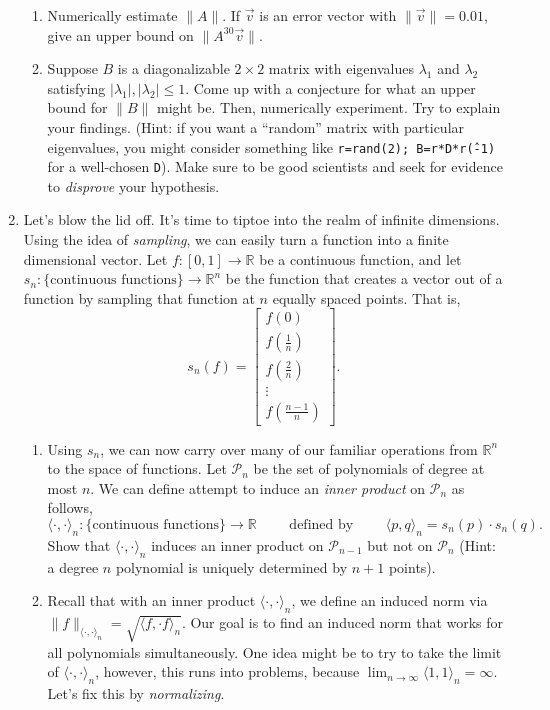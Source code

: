 \documentclass[letter]{article}
\newcommand{\R}{\mathbb{R}}
\newcommand{\mat}[1]{\begin{bmatrix}#1\end{bmatrix}}
\begin{document}
\begin{enumerate}
\begin{enumerate}
				\item Numerically estimate $\|A\|$. 
					If $\vec v$ is an error vector with $\|\vec v\|=0.01$, give an
					upper bound on $\|A^{30}\vec v\|$.
				\item Suppose $B$ is a diagonalizable $2\times 2$ matrix with eigenvalues
					$\lambda_1$ and $\lambda_2$ satisfying $|\lambda_1|,|\lambda_2|\leq 1$.
					Come up with a conjecture for what an upper bound for $\|B\|$ might be.
					Then, numerically experiment.  Try to explain your findings.  (Hint:
					if you want a ``random'' matrix with particular eigenvalues,
					you might consider something like {\tt r=rand(2); B=r*D*r\^(-1)}
					for a well-chosen {\tt D}).  Make sure to be good scientists and
					seek for evidence to \emph{disprove} your hypothesis. 
			\end{enumerate}
		\item {\sc Let's blow the lid off}.  It's time to tiptoe into the realm of infinite
			dimensions.  Using the idea of \emph{sampling}, we can easily turn a function
					into a finite dimensional vector.  Let $f:[0,1]\to\R$ be a continuous
					function, and let $s_n:\{\text{continuous functions}\}\to\R^n$
					be the function that creates a vector out of a function by sampling
					that function at $n$ equally spaced points.  That is,
					\[
						s_n(f) = \mat{f(0)\\f(\frac{1}{n})\\f(\frac{2}{n})\\\vdots\\f(\frac{n-1}{n})}.
					\]
			\begin{enumerate}
				\item Using $s_n$, we can now carry over many of our familiar operations from $\R^n$ to 
					the space of functions.  Let $\mathcal P_n$ be the set of polynomials of degree at most $n$.
					We can define attempt to induce an \emph{inner product} on $\mathcal P_n$ as follows,
					\[
						\langle\cdot,\cdot\rangle_n:\{\text{continuous functions}\}\to \R\qquad\text{ defined by }\qquad
						\langle p,q\rangle_n = s_n(p)\cdot s_n(q).
					\]
					Show that $\langle \cdot,\cdot\rangle_n$ induces an inner product on $\mathcal P_{n-1}$ but
					not on $\mathcal P_n$ (Hint: a degree $n$ polynomial is uniquely determined by $n+1$ points).
				\item Recall that with an inner product $\langle\cdot,\cdot\rangle_n$, we define an induced norm
					via $\|f\|_{\langle\cdot,\cdot\rangle_n}=\sqrt{\langle f,\cdot f\rangle_n}$.  Our goal
					is to find an induced norm that works for all polynomials simultaneously.  One idea might
					be to try to take the limit of $\langle\cdot,\cdot\rangle_n$, however, this runs into problems,
					because $\lim_{n\to\infty} \langle 1,1\rangle_n=\infty$.  Let's fix this by \emph{normalizing}.


\end{enumerate}
\end{enumerate}
\end{document}
